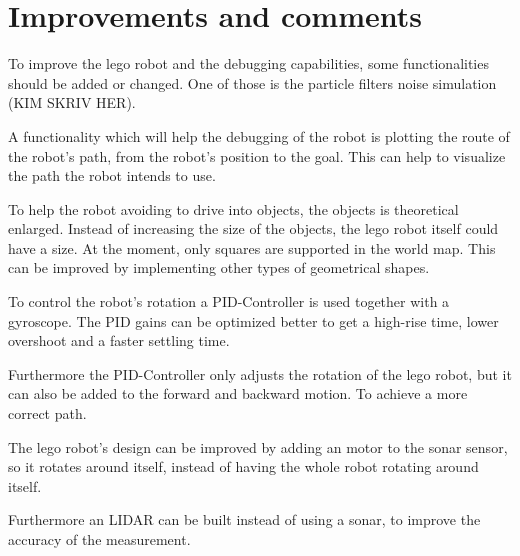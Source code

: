 \section{Improvements and comments}

To improve the lego robot and the debugging capabilities, some functionalities should be added or changed.
One of those is the particle filters noise simulation (KIM SKRIV HER).

A functionality which will help the debugging of the robot is plotting the route of the robot’s path, from the robot’s position to the goal. This can help to visualize the path the robot intends to use.

To help the robot avoiding to drive into objects, the objects is theoretical enlarged. Instead of increasing the size of the objects, the lego robot itself could have a size.
At the moment, only squares are supported in the world map. This can be improved by implementing other types of geometrical shapes.

To control the robot’s rotation a PID-Controller is used together with a gyroscope. The PID gains can be optimized better to get a high-rise time, lower overshoot and a faster settling time.

Furthermore the PID-Controller only adjusts the rotation of the lego robot, but it can also be added to the forward and backward motion. To achieve a more correct path.

The lego robot’s design can be improved by adding an motor to the sonar sensor, so it rotates around itself, instead of having the whole robot rotating around itself. 

Furthermore an LIDAR can be built instead of using a sonar, to improve the accuracy of the measurement.